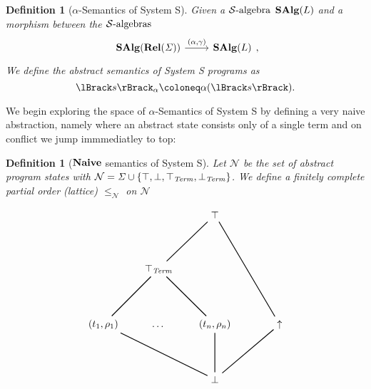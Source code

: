 \documentclass{article}
\newtheorem{definition}[theorem]{Definition}
\newcommand{\fail}{\ensuremath \text{$\uparrow$}}
\newcommand{\Term}{\ensuremath \mathit{Term}}
\newcommand{\sem}[1]{\ensuremath \lBrack #1 \rBrack}
\newcommand{\Cat}[1]{\ensuremath \mathbf{#1}}
\newcommand{\State}{\ensuremath \mathit{\Sigma} }
\newcommand{\Rel}{\ensuremath \Cat{Rel}}
\newcommand{\Naive}{\ensuremath \Cat{Naive}}
\newcommand{\SAlgebra}{\ensuremath \mathcal{S}\text{-algebra}}
\newcommand{\SAlgebras}{\ensuremath \mathcal{S}\text{-algebras}}
\newcommand{\SAlg}{\ensuremath \Cat{SAlg}}
\newcommand{\ttop}{\ensuremath \top_{\Term}}
\newcommand{\tbot}{\ensuremath \bot_{\Term}}
\begin{document}
\begin{definition}[$\alpha$-Semantics of System S] \normalfont
  Given a $\SAlgebra$ $\SAlg(L)$ and a morphism between the $\SAlgebras$
  \[
    \begin{tikzcd}
      \SAlg(\Rel(\State)) \arrow{r}{(\alpha ,\gamma)} & \SAlg(L)
    \end{tikzcd},
  \]
  We define the abstract semantics of System S programs as \[\sem{s}_\alpha \coloneq \alpha(\sem{s}). \]
\end{definition}

We begin exploring the space of $\alpha$-Semantics of System S by defining a very naive abstraction, namely where an abstract state consists only of a single term and on conflict we jump immmediatley to top:
 
\begin{definition}[$\Naive$ semantics of System S] \normalfont
  Let $\mathcal{N}$ be the set of abstract program states with $\mathcal{N} = \State \cup \lbrace \top, \bot, \ttop, \tbot \rbrace$. We define a finitely complete partial order (lattice) $\leq_\mathcal{N}$ on $\mathcal{N}$
  \[
    \begin{tikzpicture}
     \matrix (m) [matrix of nodes, row sep=4em, column sep=2em]
    {                              &                        & \node (top) {$\top$};       &                       &                         \\
                                   & \node (ttop){$\ttop$}; &                             &                       &                          \\
      \node (t1) {$(t_1,\rho_1)$}; & \node {\ldots};        & \node (tn) {$(t_n,\rho_n)$}; &                       & \node (fail) {$\fail$}; \\
                                   &                        & \node (bot) {$\bot$};       &                       &                          \\
    };

    \draw [thick] (ttop) -- (top);
    \draw [thick] (fail) -- (top);
    \draw [thick] (t1) -- (ttop);
    \draw [thick] (tn) -- (ttop);
    \draw [thick] (bot) -- (t1);
    \draw [thick] (bot) -- (tn);
    \draw [thick] (bot) -- (fail);
    \end{tikzpicture}
  \]


\end{definition}
\end{document}
